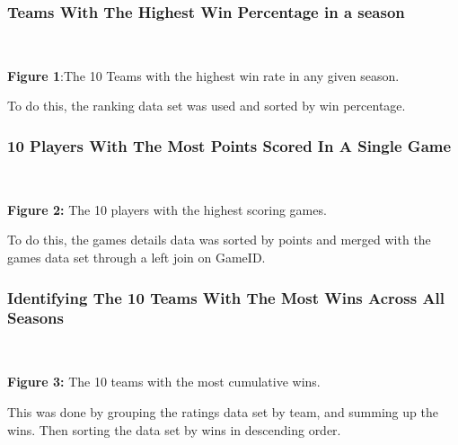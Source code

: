 \documentclass[11pt]{article}
\begin{document}
\subsubsection{Teams With The Highest Win Percentage in a season}
 \begin{center}
    \end{center}
    { \hspace*{\fill} \\}
    \begin{center}
    \textbf{Figure 1}:The 10 Teams with the highest win rate in any given season.
    \end{center}
    \medskip

    To do this, the ranking data set was used and sorted by win percentage.

    \subsubsection{10 Players With The Most Points Scored In A Single Game}

    
 \begin{center}
    \end{center}
    { \hspace*{\fill} \\}
    \begin{center}
    \textbf{Figure 2:} The 10 players with the highest scoring games.    
    \end{center}
    

    To do this, the games details data was sorted by points and merged with the games data set through a left join on GameID. 


\subsubsection{Identifying The 10 Teams With The Most Wins Across All Seasons}
 \begin{center}
    \end{center}
    { \hspace*{\fill} \\}
    \begin{center}
        \textbf{Figure 3:} The 10 teams with the most cumulative wins.
    \end{center}
    This was done by grouping the ratings data set by team, and summing up the wins. Then sorting the data set by wins in descending order.
\end{document}
